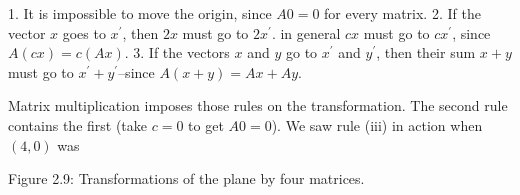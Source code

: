 1. It is impossible to move the origin, since \(A0=0\) for every matrix.
2. If the vector \(x\) goes to \(x^{\prime}\), then \(2x\) must go to \(2x^{\prime}\). in general \(cx\) must go to \(cx^{\prime}\), since \(A(cx)=c(Ax)\).
3. If the vectors \(x\) and \(y\) go to \(x^{\prime}\) and \(y^{\prime}\), then their sum \(x+y\) must go to \(x^{\prime}+y^{\prime}\)--since \(A(x+y)=Ax+Ay\).

Matrix multiplication imposes those rules on the transformation. The second rule contains the first (take \(c=0\) to get \(A0=0\)). We saw rule (iii) in action when \((4,0)\) was

Figure 2.9: Transformations of the plane by four matrices.

